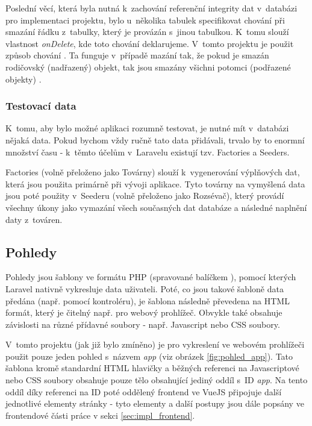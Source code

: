 	Poslední věcí, která byla nutná k~zachování referenční integrity dat v~databázi pro implementaci projektu, bylo u~několika tabulek specifikovat chování při smazání řádku z~tabulky, který je provázán s~jinou tabulkou. K~tomu slouží vlastnost \textit{onDelete}, kde toto chování deklarujeme. V~tomto projektu je použit způsob chování . Ta funguje v~případě mazání tak, že pokud je smazán rodičovský (nadřazený) objekt, tak jsou smazány všichni potomci (podřazené objekty) \cite{CascadeDel}.
		
		\subsubsection{Testovací data}
		K~tomu, aby bylo možné aplikaci rozumně testovat, je nutné mít v~databázi nějaká data. Pokud bychom vždy ručně tato data přidávali, trvalo by to enormní množství času - k~těmto účelům v~Laravelu existují tzv. Factories a Seeders.
		
		Factories (volně přeloženo jako Továrny) slouží k~vygenerování výplňových dat, která jsou použita primárně při vývoji aplikace. Tyto továrny na vymyšlená data jsou poté použity v~Seederu (volně přeloženo jako Rozsévač), který provádí všechny úkony jako vymazání všech současných dat databáze a následné naplnění daty z~továren.
	
	\subsection{Pohledy}\label{sec:be_pohledy}
	Pohledy jsou šablony ve formátu PHP (spravované balíčkem ), pomocí kterých Laravel nativně vykresluje data uživateli. Poté, co jsou takové šabloně data předána (např. pomocí kontroléru), je šablona následně převedena na HTML formát, který je čitelný např. pro webový prohlížeč. Obvykle také obsahuje závislosti na různé přídavné soubory - např. Javascript nebo CSS soubory. 
	
	V~tomto projektu (jak již bylo zmíněno) je pro vykreslení ve webovém prohlížeči použit pouze jeden pohled s~názvem \textit{app} (viz obrázek \ref{fig:pohled_app}). Tato šablona kromě standardní HTML hlavičky a běžných referenci na Javascriptové nebo CSS soubory obsahuje pouze tělo obsahující jediný oddíl s~ID \textit{app}. Na tento oddíl díky referenci na ID poté oddělený frontend ve VueJS připojuje další jednotlivé elementy stránky - tyto elementy a další postupy jsou dále popsány ve frontendové části práce v sekci \ref{sec:impl_frontend}.
	
